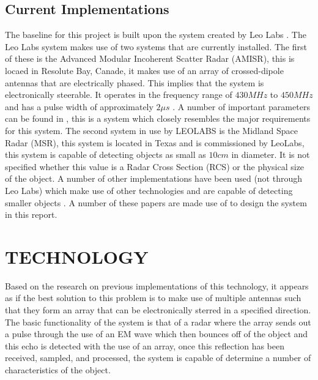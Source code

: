 \documentclass[11pt]{witseiepaper}
\begin{document}


\subsection{Current Implementations}
The baseline for this project is built upon the system created by Leo Labs \cite{LEOLABS}. The Leo Labs system makes use of two systems that are currently installed. The first of these is the Advanced Modular Incoherent Scatter Radar (AMISR), this is locaed in Resolute Bay, Canade, it makes use of an array of crossed-dipole antennas that are electrically phased. This implies that the system is electronically steerable. It operates in the frequency range of $430 MHz$ to $450 MHz$ and has a pulse width of approximately $2 \mu s$ \cite{AMISR}. A number of important parameters can be found in \cite{AMISR}, this is a system which closely resembles the major requirements for this system.
The second system in use by LEOLABS is the Midland Space Radar (MSR), this system is located in Texas and is commissioned by LeoLabs, this system is capable of detecting objects as small as $10 cm$ in diameter. It is not specified whether this value is a Radar Cross Section  (RCS) or the physical size of the object.
A number of other implementations have been used (not through Leo Labs) which make use of other technologies and are capable of detecting smaller objects \cite{EISCAT, SIMO, telescope, BeamForming, OrbitDetermination, PlanarArray}. A number of these papers are made use of to design the system in this report.


\section{TECHNOLOGY} \label{sec:TECHNOLOGY}
Based on the research on previous implementations of this technology, it appears as if the best solution to this problem is to make use of multiple antennas such that they form an array that can be electronically sterred in a specified direction.
The basic functionality of the system is that of a radar where the array sends out a pulse through the use of an EM wave which then bounces off of the object and this echo is detected with the use of an array, once this reflection has been received, sampled, and processed, the system is capable of determine a number of characteristics of the object.
\end{document}
